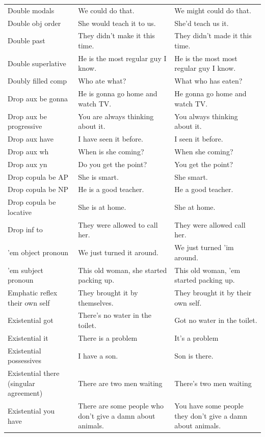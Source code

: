 \begin{longtable}{
  >{\raggedright\arraybackslash}p{3.2cm}
  >{\raggedright\arraybackslash}p{4.8cm}
  >{\raggedright\arraybackslash}p{4.8cm}
}
Double modals & We could do that. & We might could do that. \\
Double obj order & She would teach it to us. & She'd teach us it. \\
Double past & They didn't make it this time. & They didn't made it this time. \\
Double superlative & He is the most regular guy I know. & He is the most most regular guy I know. \\
Doubly filled comp & Who ate what? & What who has eaten? \\
Drop aux be gonna & He is gonna go home and watch TV. & He gonna go home and watch TV. \\
Drop aux be progressive & You are always thinking about it. & You always thinking about it. \\
Drop aux have & I have seen it before. & I seen it before. \\
Drop aux wh & When is she coming? & When she coming? \\
Drop aux yn & Do you get the point? & You get the point? \\
Drop copula be AP & She is smart. & She smart. \\
Drop copula be NP & He is a good teacher. & He a good teacher. \\
Drop copula be locative & She is at home. & She at home. \\
Drop inf to & They were allowed to call her. & They were allowed call her. \\
'em object pronoun & We just turned it around. & We just turned 'im around. \\
'em subject pronoun & This old woman, she started packing up. & This old woman, 'em started packing up. \\
Emphatic reflex their own self & They brought it by themselves. & They brought it by their own self. \\
Existential got & There's no water in the toilet. & Got no water in the toilet. \\
Existential it & There is a problem & It's a problem \\
Existential possessives & I have a son. & Son is there. \\
Existential there (singular agreement) & There are two men waiting & There's two men waiting \\
Existential you have & There are some people who don't give a damn about animals. & You have some people they don't give a damn about animals. \\

\end{longtable}
